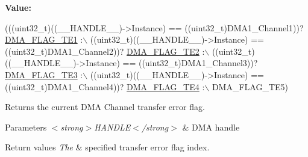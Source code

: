 {\bfseries Value\+:}
\begin{DoxyCode}
(((uint32\_t)((\_\_HANDLE\_\_)->Instance) == ((uint32\_t)DMA1\_Channel1))? \hyperlink{group___d_m_a__flag__definitions_ga198c0b4984a79514964d3dd5ae546008}{DMA\_FLAG\_TE1} :\(\backslash\)
 ((uint32\_t)((\_\_HANDLE\_\_)->Instance) == ((uint32\_t)DMA1\_Channel2))? \hyperlink{group___d_m_a__flag__definitions_ga6d81cc881182d35ba7a34c2759cd97f3}{DMA\_FLAG\_TE2} :\(\backslash\)
 ((uint32\_t)((\_\_HANDLE\_\_)->Instance) == ((uint32\_t)DMA1\_Channel3))? \hyperlink{group___d_m_a__flag__definitions_ga3e3d70e09d144c82ffc17d2ece186339}{DMA\_FLAG\_TE3} :\(\backslash\)
 ((uint32\_t)((\_\_HANDLE\_\_)->Instance) == ((uint32\_t)DMA1\_Channel4))? \hyperlink{group___d_m_a__flag__definitions_gab1bb20d71697de115b87319347216a26}{DMA\_FLAG\_TE4} :\(\backslash\)
   DMA\_FLAG\_TE5)
\end{DoxyCode}


Returns the current D\+MA Channel transfer error flag. 


\begin{DoxyParams}{Parameters}
{\em $<$strong$>$\+H\+A\+N\+D\+L\+E$<$/strong$>$} & D\+MA handle \\
\hline
\end{DoxyParams}

\begin{DoxyRetVals}{Return values}
{\em The} & specified transfer error flag index. \\
\hline
\end{DoxyRetVals}
